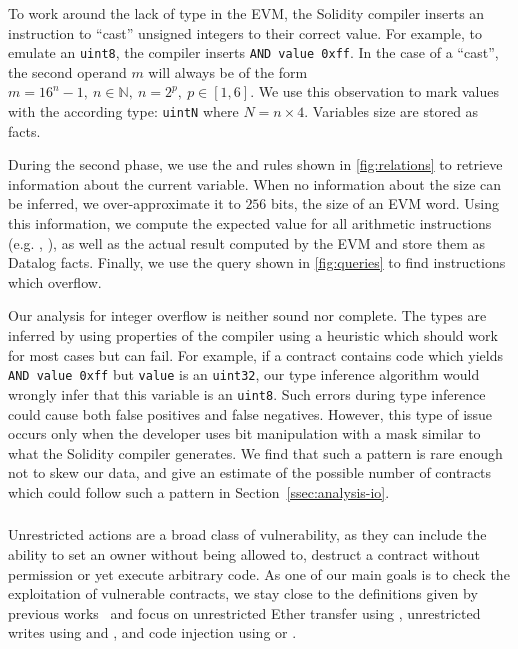 To work around the lack of type in the EVM, the Solidity compiler inserts an  instruction to ``cast'' unsigned integers to their correct value. For example, to emulate an \lstinline{uint8}, the compiler inserts \lstinline{AND value 0xff}. In the case of a ``cast'', the second operand $m$ will always be of the form $m = 16^n - 1,~n\in \mathbb{N},~n = 2^p,~p \in [1, 6]$. We use this observation to mark values with the according type: \lstinline{uintN} where $N = n \times 4$. Variables size are stored as  facts.

During the second phase, we use the  and  rules shown in \autoref{fig:relations} to retrieve information about the current variable. When no information about the size can be inferred, we over-approximate it to $256$ bits, the size of an EVM word. Using this information, we compute the expected value for all arithmetic instructions (e.g. , ), as well as the actual result computed by the EVM and store them as Datalog facts. Finally, we use the query shown in \autoref{fig:queries} to find instructions which overflow.

\correctness Our analysis for integer overflow is neither sound nor complete. The types are inferred by using properties of the compiler using a heuristic which should work for most cases but can fail.
For example, if a contract contains code which yields \lstinline{AND value 0xff} but \lstinline{value} is an \lstinline{uint32}, our type inference algorithm would wrongly infer that this variable is an \lstinline{uint8}.
Such errors during type inference could cause both false positives and false negatives.
However, this type of issue occurs only when the developer uses bit manipulation with a mask similar to what the Solidity compiler generates.
We find that such a pattern is rare enough not to skew our data, and give an estimate of the possible number of contracts which could follow such a pattern in Section~\ref{ssec:analysis-io}.

\subsubsection{\unrestrictedaction}
\label{ssec:method-ua}
Unrestricted actions are a broad class of vulnerability, as they can include the ability to set an owner without being allowed to, destruct a contract without permission or yet execute arbitrary code.
As one of our main goals is to check the exploitation of vulnerable contracts, we stay close to the definitions given by previous works~\cite{Krupp2018} and focus on unrestricted Ether transfer using , unrestricted writes using and , and code injection using  or .


